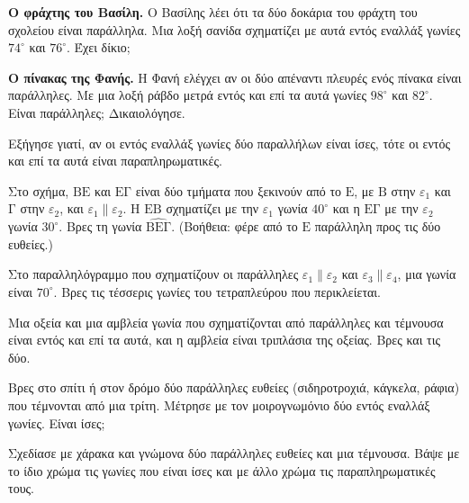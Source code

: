 \ex \textbf{Ο φράχτης του Βασίλη.} Ο Βασίλης λέει ότι τα δύο δοκάρια του φράχτη του σχολείου είναι παράλληλα. Μια λοξή σανίδα σχηματίζει με αυτά εντός εναλλάξ γωνίες $74^\circ$ και $76^\circ$. Έχει δίκιο;

\ex \textbf{Ο πίνακας της Φανής.} Η Φανή ελέγχει αν οι δύο απέναντι πλευρές ενός πίνακα είναι παράλληλες. Με μια λοξή ράβδο μετρά εντός και επί τα αυτά γωνίες $98^\circ$ και $82^\circ$. Είναι παράλληλες; Δικαιολόγησε.


\ex Εξήγησε γιατί, αν οι εντός εναλλάξ γωνίες δύο παραλλήλων είναι ίσες, τότε οι εντός και επί τα αυτά είναι παραπληρωματικές.

\ex Στο σχήμα, $\mathrm{ΒΕ}$ και $\mathrm{ΕΓ}$ είναι δύο τμήματα που ξεκινούν από το $\mathrm{Ε}$, με $\mathrm{Β}$ στην $\varepsilon_1$ και $\mathrm{Γ}$ στην $\varepsilon_2$, και $\varepsilon_1\parallel\varepsilon_2$. Η $\mathrm{ΕΒ}$ σχηματίζει με την $\varepsilon_1$ γωνία $40^\circ$ και η $\mathrm{ΕΓ}$ με την $\varepsilon_2$ γωνία $30^\circ$. Βρες τη γωνία $\widehat{\mathrm{ΒΕΓ}}$. (Βοήθεια: φέρε από το $\mathrm{Ε}$ παράλληλη προς τις δύο ευθείες.)

\begin{center}
\end{center}

\ex Στο παραλληλόγραμμο που σχηματίζουν οι παράλληλες $\varepsilon_1\parallel\varepsilon_2$ και $\varepsilon_3\parallel\varepsilon_4$, μια γωνία είναι $70^\circ$. Βρες τις τέσσερις γωνίες του τετραπλεύρου που περικλείεται.

\ex Μια οξεία και μια αμβλεία γωνία που σχηματίζονται από παράλληλες και τέμνουσα είναι εντός και επί τα αυτά, και η αμβλεία είναι τριπλάσια της οξείας. Βρες και τις δύο.


\ex Βρες στο σπίτι ή στον δρόμο δύο παράλληλες ευθείες (σιδηροτροχιά, κάγκελα, ράφια) που τέμνονται από μια τρίτη. Μέτρησε με τον μοιρογνωμόνιο δύο εντός εναλλάξ γωνίες. Είναι ίσες;

\ex Σχεδίασε με χάρακα και γνώμονα δύο παράλληλες ευθείες και μια τέμνουσα. Βάψε με το ίδιο χρώμα τις γωνίες που είναι ίσες και με άλλο χρώμα τις παραπληρωματικές τους.
